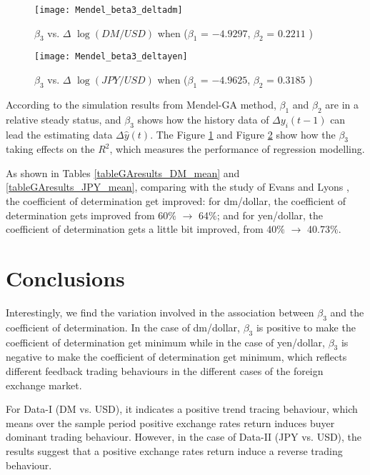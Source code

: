 \begin{figure}[h!]
\centering
\texttt{[image: Mendel\_beta3\_deltadm]}
\caption{$\beta_3$ vs. $\Delta$ $\log(DM/USD)$ when ($\beta_1$ =
$-4.9297$, $\beta_2$ = $0.2211$ )} \label{Mendel_beta3_deltadm}
\end{figure}

\begin{figure}[h!]
\centering
\texttt{[image: Mendel\_beta3\_deltayen]}
\caption{$\beta_3$ vs. $\Delta$ $\log(JPY/USD)$ when ($\beta_1$ = $
-4.9625$, $\beta_2$ = $0.3185$ )} \label{Mendel_beta3_deltayen}
\end{figure}

According to the simulation results from Mendel-GA method, $\beta_1$
and $\beta_2$ are in a relative steady status, and $\beta_3$ shows
how the history data of $\Delta y_i(t-1)$ can lead the estimating
data $\Delta \hat{y}(t)$. The Figure \ref{Mendel_beta3_deltadm} and
Figure \ref{Mendel_beta3_deltayen} show how the $\beta_3$ taking
effects on the $R^2$, which measures the performance of regression
modelling.

As shown in Tables \ref{tableGAresults_DM_mean} and
\ref{tableGAresults_JPY_mean}, comparing with the study of Evans and
Lyons \cite{Evans2002}, the coefficient of determination get
improved: for dm/dollar, the coefficient of determination gets
improved from 60$\%$ $\rightarrow$ 64$\%$; and for yen/dollar, the
coefficient of determination gets a little bit improved, from 40$\%$
$\rightarrow$ 40.73$\%$.

\section{Conclusions}
\label{Conclusions}

Interestingly, we find the variation involved in the association
between $\beta_3$ and the coefficient of determination. In the case
of dm/dollar, $\beta_3$ is positive to make the coefficient of
determination get minimum while in the case of yen/dollar, $\beta_3$
is negative to make the coefficient of determination get minimum, which reflects different feedback trading behaviours in the different cases of the foreign exchange market.

For Data-I (DM vs. USD), it indicates a positive trend tracing
behaviour, which means over the sample period positive exchange
rates return induces buyer dominant trading behaviour. However, in
the case of Data-II (JPY vs. USD), the results suggest that a
positive exchange rates return induce a reverse trading behaviour.

